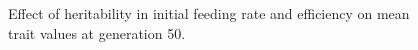 \begin{figure}[h]
{  }
  \caption{Effect of heritability in initial feeding rate and efficiency on mean trait values at generation 50.}
  \label{fig:hrt_fr_eff}
\end{figure}
\begin{figure}[p]
  \\
\end{figure}
